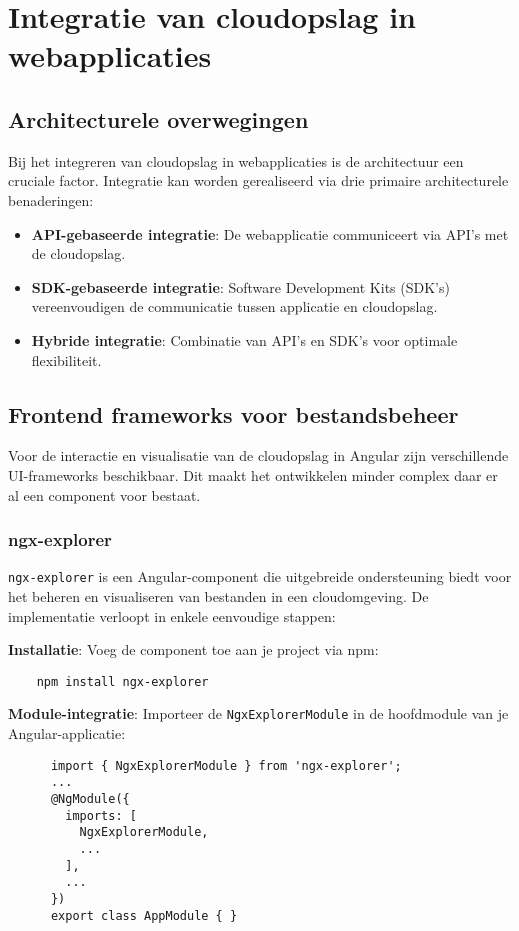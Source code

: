 \section{Integratie van cloudopslag in webapplicaties}
\subsection{Architecturele overwegingen}
Bij het integreren van cloudopslag in webapplicaties is de architectuur een cruciale factor. Integratie kan worden gerealiseerd via drie primaire architecturele benaderingen:
\begin{itemize}
  \item \textbf{API-gebaseerde integratie}: De webapplicatie communiceert via API's met de cloudopslag.
  \item \textbf{SDK-gebaseerde integratie}: Software Development Kits (SDK's) vereenvoudigen de communicatie tussen applicatie en cloudopslag.
  \item \textbf{Hybride integratie}: Combinatie van API's en SDK's voor optimale flexibiliteit.
\end{itemize}

\subsection{Frontend frameworks voor bestandsbeheer}
Voor de interactie en visualisatie van de cloudopslag in Angular zijn verschillende UI-frameworks beschikbaar. Dit maakt het ontwikkelen minder complex daar er al een component voor bestaat.

\subsubsection{ngx-explorer}
\texttt{ngx-explorer} is een Angular-component die uitgebreide ondersteuning biedt voor het beheren en visualiseren van bestanden in een cloudomgeving. De implementatie verloopt in enkele eenvoudige stappen:

\textbf{Installatie}: Voeg de component toe aan je project via npm:
\begin{listing}
  \begin{verbatim}
    npm install ngx-explorer
  \end{verbatim}
\end{listing}

\textbf{Module-integratie}: Importeer de \texttt{NgxExplorerModule} in de hoofdmodule van je Angular-applicatie:
  \begin{listing}
    \begin{verbatim}
      import { NgxExplorerModule } from 'ngx-explorer';
      ...
      @NgModule({
        imports: [
          NgxExplorerModule,
          ...
        ],
        ...
      })
      export class AppModule { }
    \end{verbatim}
  \end{listing}
  

